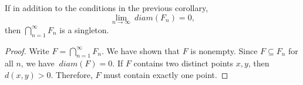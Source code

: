 \begin{prop}
    If in addition to the conditions in the previous corollary, 
    \[
    \lim_{n\to\infty} ~diam (F_n) = 0,
    \]
    then $\bigcap_{n=1}^\infty F_n$ is a singleton.
    \begin{proof}
        Write $F = \bigcap_{n=1}^\infty F_n$. We have shown that $F$ is nonempty. Since $F \subseteq F_n$ for all $n$, we have $~diam (F) = 0$. If $F$ contains two distinct points $x, y$, then $d(x, y) > 0$. Therefore, $F$ must contain exactly one point. 
    \end{proof}
\end{prop}